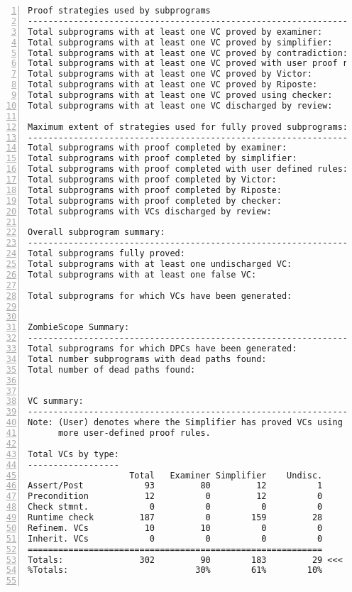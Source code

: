 \begin{lstlisting}[gobble=0, numbers=left, caption={POGS report for PCA Pump prototype}, label={listing:pca_ravenscar:pogs_full}]
Proof strategies used by subprograms
-------------------------------------------------------------------------
Total subprograms with at least one VC proved by examiner:             15
Total subprograms with at least one VC proved by simplifier:           20
Total subprograms with at least one VC proved by contradiction:         0
Total subprograms with at least one VC proved with user proof rule:     0
Total subprograms with at least one VC proved by Victor:                0
Total subprograms with at least one VC proved by Riposte:               0
Total subprograms with at least one VC proved using checker:            0
Total subprograms with at least one VC discharged by review:            0

Maximum extent of strategies used for fully proved subprograms:
-------------------------------------------------------------------------
Total subprograms with proof completed by examiner:                     0
Total subprograms with proof completed by simplifier:                  14
Total subprograms with proof completed with user defined rules:         0
Total subprograms with proof completed by Victor:                       0
Total subprograms with proof completed by Riposte:                      0
Total subprograms with proof completed by checker:                      0
Total subprograms with VCs discharged by review:                        0

Overall subprogram summary:
-------------------------------------------------------------------------
Total subprograms fully proved:                                        14
Total subprograms with at least one undischarged VC:                    8  <<<
Total subprograms with at least one false VC:                           0
                                                                    -----
Total subprograms for which VCs have been generated:                   22


ZombieScope Summary:
-------------------------------------------------------------------------
Total subprograms for which DPCs have been generated:                  22
Total number subprograms with dead paths found:                         3
Total number of dead paths found:                                      32


VC summary:
-------------------------------------------------------------------------
Note: (User) denotes where the Simplifier has proved VCs using one or
      more user-defined proof rules.

Total VCs by type:
------------------
                    Total   Examiner Simplifier    Undisc.
Assert/Post            93         80         12          1
Precondition           12          0         12          0
Check stmnt.            0          0          0          0
Runtime check         187          0        159         28
Refinem. VCs           10         10          0          0
Inherit. VCs            0          0          0          0
==========================================================
Totals:               302         90        183         29 <<<
%Totals:                         30%        61%        10%


\end{lstlisting}
